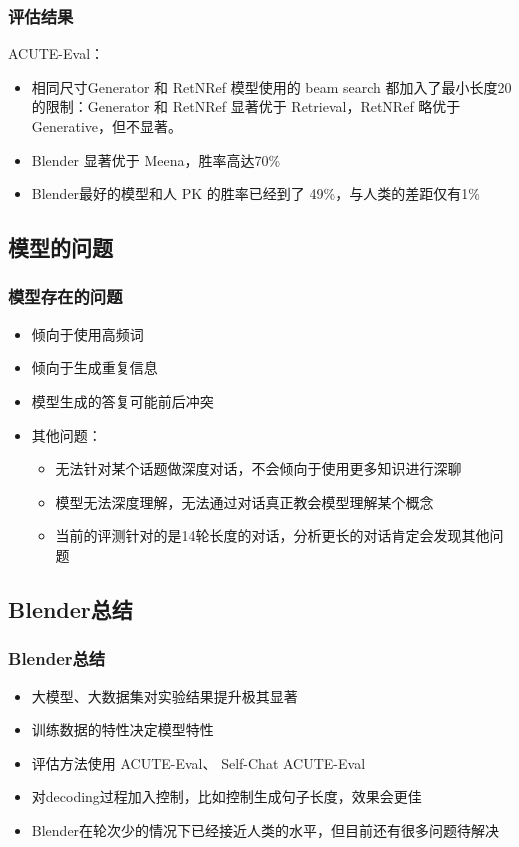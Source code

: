 \documentclass{beamer}
\begin{document}
\begin{frame}
    \frametitle{评估结果}

    ACUTE-Eval：

    \begin{itemize}
        \item 相同尺寸Generator 和 RetNRef 模型使用的 beam search 都加入了最小长度20的限制：Generator 和 RetNRef 显著优于 Retrieval，RetNRef 略优于 Generative，但不显著。
        \item Blender 显著优于 Meena，胜率高达70\%
        \item Blender最好的模型和人 PK 的胜率已经到了 49\%，与人类的差距仅有1\%
    \end{itemize}

\end{frame}

\subsection{模型的问题}
\begin{frame}
    \frametitle{模型存在的问题}

    \begin{itemize}
        \item 倾向于使用高频词
        \item 倾向于生成重复信息
        \item 模型生成的答复可能前后冲突
        \item 其他问题：
        \begin{itemize}
            \item 无法针对某个话题做深度对话，不会倾向于使用更多知识进行深聊
            \item 模型无法深度理解，无法通过对话真正教会模型理解某个概念
            \item 当前的评测针对的是14轮长度的对话，分析更长的对话肯定会发现其他问题
        \end{itemize}
    \end{itemize}

\end{frame}

\subsection{Blender总结}
\begin{frame}
    \frametitle{Blender总结}

    \begin{itemize}
        \item 大模型、大数据集对实验结果提升极其显著
        \item 训练数据的特性决定模型特性
        \item 评估方法使用 ACUTE-Eval、 Self-Chat ACUTE-Eval
        \item 对decoding过程加入控制，比如控制生成句子长度，效果会更佳
        \item Blender在轮次少的情况下已经接近人类的水平，但目前还有很多问题待解决
    \end{itemize}

\end{frame}
\end{document}
